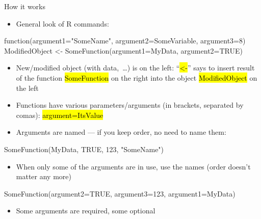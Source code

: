 \documentclass[compress, ucs, xelatex, 11pt, xcolor=svgnames,
  hyperref={
    bookmarks=true,
    unicode=true,
    colorlinks=true,
    pdftitle={Molecular data in R},
    plainpages=false,
    pdfauthor={Vojtech Zeisek},
    pdfsubject={Course about phylogeny and evolution in R},
    pdfcreator={XeLaTeX},
    pdfkeywords={R, evolution, phylogeny, molecular data},
    linkcolor=Tomato,
    anchorcolor=SaddleBrown,
    citecolor=Goldenrod,
    filecolor=DarkMagenta,
    menucolor=Sienna,
    urlcolor=DarkTurquoise,
    pdftex},
  url={hyphens, lowtilde} %
  ]{beamer}
\renewcommand{\texttt}[1]{\hl{\ttfamily #1}}
\begin{document}
\begin{frame}[fragile]{How it works}
  \begin{itemize}
    \item General look of R commands:
  \end{itemize}
  \begin{spluscode}
    function(argument1="SomeName", argument2=SomeVariable, argument3=8)
    ModifiedObject <- SomeFunction(argument1=MyData, argument2=TRUE)
  \end{spluscode}
  \begin{itemize}
    \item New/modified object (with data,~\ldots) is on the left: ``\texttt{<-}'' says to insert result of the function \texttt{SomeFunction} on the right into the object \texttt{ModifiedObject} on the left
    \item Functions have various parameters/arguments (in brackets, separated by comas): \texttt{argument=ItsValue}
    \item Arguments are named --- if you keep order, no need to name them:
  \end{itemize}
  \begin{spluscode}
    SomeFunction(MyData, TRUE, 123, "SomeName")
  \end{spluscode}
  \begin{itemize}
    \item When only some of the arguments are in use, use the names (order doesn't matter any more)
  \end{itemize}
  \begin{spluscode}
    SomeFunction(argument2=TRUE, argument3=123, argument1=MyData)
  \end{spluscode}
  \begin{itemize}
    \item Some arguments are required, some optional
  \end{itemize}
\end{frame}
\end{document}
